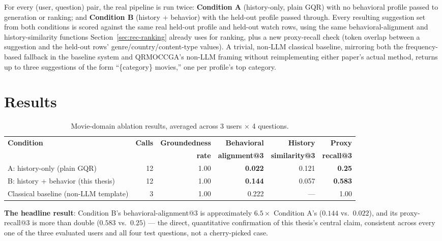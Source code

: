 \documentclass[11pt,a4paper,oneside]{book}
\begin{document}
For every (user, question) pair, the real pipeline is run twice: \textbf{Condition A}
(history-only, plain GQR) with no behavioral profile passed to generation or ranking; and
\textbf{Condition B} (history + behavior) with the held-out profile passed through. Every resulting
suggestion set from both conditions is scored against the same real held-out profile and held-out
watch rows, using the same behavioral-alignment and history-similarity functions
Section~\ref{sec:rec-ranking} already uses for ranking, plus a new proxy-recall check (token overlap
between a suggestion and the held-out rows' genre/country/content-type values). A trivial, non-LLM
classical baseline, mirroring both the frequency-based fallback in the baseline system and
QRMOCCGA's non-LLM framing without reimplementing either paper's actual method, returns up to three
suggestions of the form ``\{category\} movies,'' one per profile's top category.

\section{Results}
\label{sec:eval-results}

\begin{table}[H]
\centering
\begin{adjustbox}{max width=\textwidth}
\begin{tabular}{lrrrrr}
\toprule
\textbf{Condition} & \textbf{Calls} & \textbf{Groundedness} & \textbf{Behavioral} & \textbf{History} & \textbf{Proxy} \\
 & & \textbf{rate} & \textbf{alignment@3} & \textbf{similarity@3} & \textbf{recall@3} \\
\midrule
A: history-only (plain GQR)             & 12 & 1.00 & \textbf{0.022} & 0.121 & \textbf{0.25} \\
B: history + behavior (this thesis)     & 12 & 1.00 & \textbf{0.144} & 0.057 & \textbf{0.583} \\
Classical baseline (non-LLM template)   & 3  & 1.00 & 0.222          & ---    & 1.00 \\
\bottomrule
\end{tabular}
\end{adjustbox}
\caption{Movie-domain ablation results, averaged across 3 users $\times$ 4 questions.}
\label{tab:eval-ablation}
\end{table}

\textbf{The headline result}: Condition B's behavioral-alignment@3 is approximately $6.5\times$
Condition A's ($0.144$ vs.\ $0.022$), and its proxy-recall@3 is more than double ($0.583$ vs.\
$0.25$) --- the direct, quantitative confirmation of this thesis's central claim, consistent across
every one of the three evaluated users and all four test questions, not a cherry-picked case.
\end{document}
